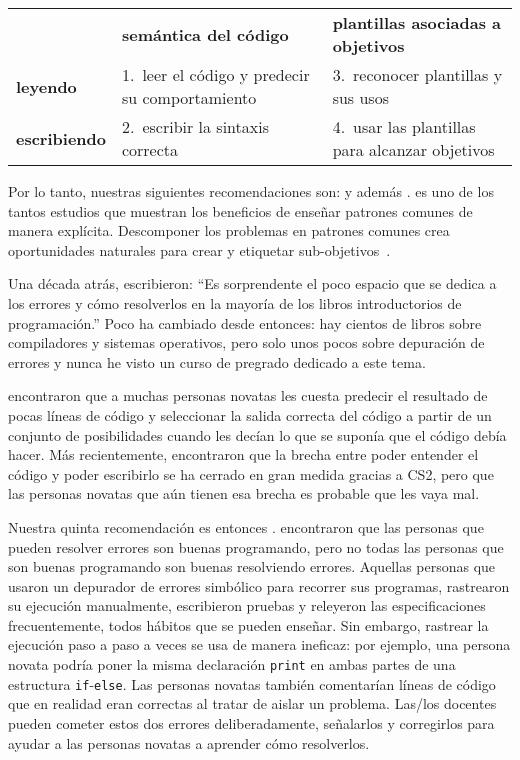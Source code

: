 \begin{longtable}{lll}
			& \textbf{semántica del código}				& \textbf{plantillas asociadas a objetivos} \\
\textbf{leyendo}	& 1.\ leer el código y predecir su comportamiento	& 3.\ reconocer plantillas y sus usos \\
\textbf{escribiendo}	& 2.\ escribir la sintaxis correcta			& 4.\ usar las plantillas para alcanzar objetivos
\end{longtable}

Por lo tanto, nuestras siguientes recomendaciones son:
 y además  .
\cite{Mull2007b} es uno de los tantos estudios que muestran los beneficios de enseñar patrones comunes de manera explícita. Descomponer los problemas
en patrones comunes crea oportunidades naturales para crear y etiquetar sub-objetivos~\cite{Marg2012,Marg2016}.


Una década atrás,
\cite{McCa2008} escribieron:
``Es sorprendente el poco espacio que se dedica a los errores y cómo resolverlos
en la mayoría de los libros introductorios de programación.''
Poco ha cambiado desde entonces:
hay cientos de libros sobre compiladores y sistemas operativos,
pero solo unos pocos sobre depuración de errores 
y nunca he visto un curso de pregrado dedicado a este tema.

\cite{List2004,List2009} encontraron que a muchas personas novatas les cuesta predecir el resultado de pocas líneas de código
y seleccionar la salida correcta del código a partir de un conjunto de posibilidades
cuando les decían lo que se suponía que el código debía hacer. Más recientemente,
\cite{Harr2018} encontraron que la brecha entre poder entender el código y poder escribirlo se ha cerrado en gran medida gracias a CS2,
pero que las personas novatas que aún tienen esa brecha es probable que les vaya mal.

Nuestra quinta recomendación es entonces .
\cite{Fitz2008,Murp2008} encontraron que las personas que pueden resolver errores son buenas programando,
pero no todas las personas que son buenas programando son buenas resolviendo errores.
Aquellas personas que usaron un depurador de errores simbólico para recorrer sus programas,
rastrearon su ejecución manualmente,
escribieron pruebas
y releyeron las especificaciones frecuentemente,
todos hábitos que se pueden enseñar.
Sin embargo,
rastrear la ejecución paso a paso a veces se usa de manera ineficaz:
por ejemplo,
una persona novata podría poner la misma declaración \texttt{print} en ambas partes de una estructura \texttt{if}-\texttt{else}.
Las personas novatas también comentarían líneas de código que en realidad eran correctas al tratar de aislar un problema.
Las/los docentes pueden cometer estos dos errores deliberadamente,
señalarlos
y corregirlos para ayudar a las personas novatas a aprender cómo resolverlos.

